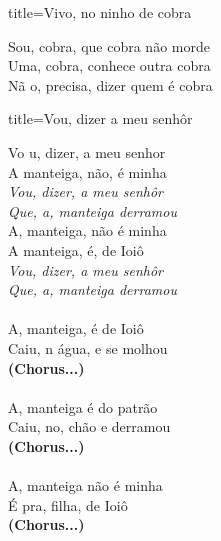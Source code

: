 \documentclass[fontsize=14pt, twoside]{scrreprt}
\begin{document}
\begin{multicols*}{2}
\begin{song}{title={Vivo, no ninho de cobra}}
        \begin{verse*}
            Sou, cobra, que cobra não morde\\
            Uma, cobra, conhece outra cobra\\
            Nã o, precisa, dizer quem é cobra\\
        \end{verse*}
\end{song}

\begin{song}{title={Vou, dizer a meu senhôr}}
        \begin{verse*}
            Vo u, dizer, a meu senhor\\
            A manteiga, não, é minha\\
            \textit{Vou, dizer, a meu senhôr}\\
            \textit{Que, a, manteiga derramou}\\
            A, manteiga, não é minha\\
            A manteiga, é, de Ioiô\\
            \textit{Vou, dizer, a meu senhôr}\\
            \textit{Que, a, manteiga derramou}\\
\\
            A, manteiga, é de Ioiô\\
            Caiu, n água, e se molhou\\
            \textbf{(Chorus...)}\\
\\
            A, manteiga é do patrão\\
            Caiu, no, chão e derramou\\
            \textbf{(Chorus...)}\\
\\
            A, manteiga não é minha\\
            É pra, filha, de Ioiô\\
            \textbf{(Chorus...)}\\
        \end{verse*}
\end{song}


\end{multicols*}
\end{document}
